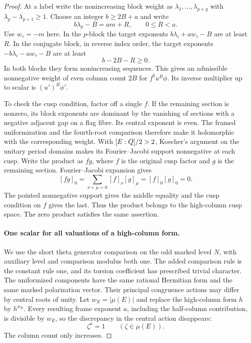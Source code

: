 \begin{proof}
At a label write the nonincreasing block weight as
\(\lambda_1,\ldots,\lambda_{p+q}\) with
\(\lambda_p-\lambda_{p+1}\ge1\).
Choose an integer \(b\ge 2B+a\) and write
\[
 b\lambda_p-B=am+R,\qquad 0\le R<a.
\]
Use \(w_\tau=-m\) here. In the \(p\)-block the target
exponents \(b\lambda_i+aw_\tau-B\) are at least \(R\).
In the conjugate block, in reverse index order, the target
exponents \(-b\lambda_i-aw_\tau-B\) are at least
\[
 b-2B-R\ge0.
\]
In both blocks they form nonincreasing
sequences. This gives an admissible nonnegative weight of even
column count \(2B\) for \(f^b u^B\phi\). Its inverse multiplier
up to scalar is \((u')^B\phi'\).

To check the cusp condition, factor off a single \(f\).
If the remaining section is nonzero, its block exponents
are dominant by the vanishing of sections with a negative
adjacent gap on a flag fibre. Its central exponent is even.
The framed uniformization and the fourth-root comparison
therefore make it holomorphic with the corresponding
weight. With \([E:Q]/2>2\), Koecher's argument on the
unitary period domains makes its Fourier--Jacobi support
nonnegative at each cusp. Write the product as \(fg\), where \(f\) is the
original cusp factor and \(g\) is the remaining section.
Fourier--Jacobi expansion gives
\[
    [fg]_0=\sum_{\nu+\mu=0}[f]_\nu[g]_\mu
           =[f]_0[g]_0=0 .
\]
The pointed nonnegative support gives the middle equality
and the cusp condition on \(f\) gives the last. Thus the product
belongs to the high-column cusp space. The zero product
satisfies the same assertion.
\label{cor:deep-cover-denominators-8}

\paragraph{One scalar for all valuations of a high-column form.}
We use the short theta generator comparison on the odd marked
level \(N\), with auxiliary level and comparison modulus both
one. The added comparison rule is the constant rule one, and
its torsion coefficient has prescribed trivial character. The
uniformized components have the same rational Hermitian form
and the same marked polarization vector. Their principal
congruence actions may differ by central roots of unity. Let \(w_E=|\mu(E)|\) and replace the high-column form \(h\) by
\(h^{w_E}\). Every resulting frame exponent \(a\), including the
half-column contribution, is divisible by \(w_E\), so the discrepancy
in the central action disappears:
\[
                     \zeta^a=1\qquad(\zeta\in\mu(E)).
\] The column count only increases.


\end{proof}
